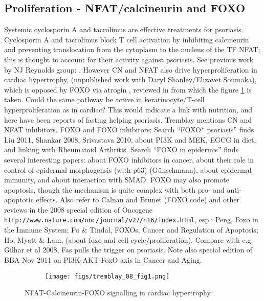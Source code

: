 \documentclass[a4paper,10pt]{report}
\begin{document}
\subsection{Proliferation - NFAT/calcineurin and FOXO}

Systemic cyclosporin A and tacrolimus are effective treatments for psoriasis. Cyclosporin A and tacrolimus block T cell activation by inhibiting calcineurin and preventing translocation from the cytoplasm to the nucleus of the TF NFAT; this is thought to account for their activity against psoriasis. See previous work by NJ Reynolds group: \cite{aldaraji2002localization}. However CN and NFAT also drive hyperproliferation in cardiac hypertrophy, (unpublished work with Daryl Shanley/Elizavet Soumaka), which is opposed by FOXO via atrogin \cite{ni2006foxo, ni2007foxo, li2007atrogin}, reviewed in \cite{tremblay2008phosphatases} from which the figure \ref{fig:tremblayfoxonfat} is taken. Could the same pathway be active in keratinocyte/T-cell hyperproliferation as in cardiac? This would indicate a link with nutrition, and here have been reports of fasting helping psoriasis. Tremblay mentions CN and NFAT inhibitors. FOXO and FOXO inhibitors: Search ``FOXO* psoriasis'' finds Liu 2011, Shankar 2008, Srivastava 2010, about PI3K and MEK, EGCG in diet, and linking with Rheumatoid Arthritis. Search ``FOXO in epidermis'' finds several interesting papers: about FOXO inhibitors in cancer, about their role in control of epidermal morphogensis (with p63) (G\"{u}nschmann), about epidermal immunity, and about interaction with SMAD. FOXO may also promote apoptosis, though the mechanism is quite complex with both pro- and anti- apoptotic effects. Also refer to Calnan and Brunet (FOXO code) and other reviews in the 2008 special edition of Oncogene {\tt http://www.nature.com/onc/journal/v27/n16/index.html}, esp.: Peng, Foxo in the Immune System; Fu \& Tindal, FOXOs, Cancer and Regulation of Apoptosis; Ho, Myatt \& Lam, (about foxo and cell cycle/proliferation). Compare with e.g. Gilhar et al 2008, Fas pulls the trigger on psoriasis. 
Note also special edition of BBA Nov 2011 on PI3K-AKT-FoxO axis in Cancer and Aging. 


\begin{figure}[h!]
    \centering  
  \begin{subfigure}{.6\textwidth}
    \texttt{[image: figs/tremblay\_08\_fig1.png]}
  \end{subfigure}
  \caption{NFAT-Calcineurin-FOXO signalling in cardiac hypertrophy \cite{tremblay2008phosphatases}}
  \label{fig:tremblayfoxonfat}
\end{figure}
\end{document}
